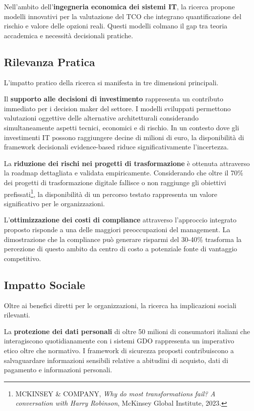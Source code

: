 Nell'ambito dell'\textbf{ingegneria economica dei sistemi IT}, la ricerca propone modelli innovativi per la valutazione del TCO che integrano quantificazione del rischio e valore delle opzioni reali. Questi modelli colmano il gap tra teoria accademica e necessità decisionali pratiche.

\subsection{Rilevanza Pratica}

L'impatto pratico della ricerca si manifesta in tre dimensioni principali.

Il \textbf{supporto alle decisioni di investimento} rappresenta un contributo immediato per i decision maker del settore. I modelli sviluppati permettono valutazioni oggettive delle alternative architetturali considerando simultaneamente aspetti tecnici, economici e di rischio. In un contesto dove gli investimenti IT possono raggiungere decine di milioni di euro, la disponibilità di framework decisionali evidence-based riduce significativamente l'incertezza.

La \textbf{riduzione dei rischi nei progetti di trasformazione} è ottenuta attraverso la roadmap dettagliata e validata empiricamente. Considerando che oltre il 70\% dei progetti di trasformazione digitale fallisce o non raggiunge gli obiettivi prefissati\footnote{MCKINSEY \& COMPANY, \textit{Why do most transformations fail? A conversation with Harry Robinson}, McKinsey Global Institute, 2023.}, la disponibilità di un percorso testato rappresenta un valore significativo per le organizzazioni.

L'\textbf{ottimizzazione dei costi di compliance} attraverso l'approccio integrato proposto risponde a una delle maggiori preoccupazioni del management. La dimostrazione che la compliance può generare risparmi del 30-40\% trasforma la percezione di questo ambito da centro di costo a potenziale fonte di vantaggio competitivo.

\subsection{Impatto Sociale}

Oltre ai benefici diretti per le organizzazioni, la ricerca ha implicazioni sociali rilevanti.

La \textbf{protezione dei dati personali} di oltre 50 milioni di consumatori italiani che interagiscono quotidianamente con i sistemi GDO rappresenta un imperativo etico oltre che normativo. I framework di sicurezza proposti contribuiscono a salvaguardare informazioni sensibili relative a abitudini di acquisto, dati di pagamento e informazioni personali.

